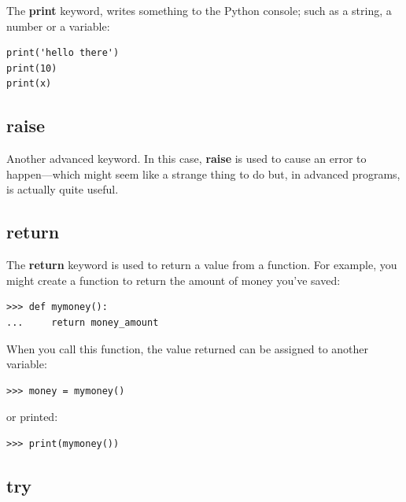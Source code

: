 The \textbf{print} keyword, writes something to the Python console; such as a string, a number or a variable:

\begin{listing}
\begin{verbatim}
print('hello there')
print(10)
print(x)
\end{verbatim}
\end{listing}

\subsection*{raise}

Another advanced keyword.  In this case, \textbf{raise} is used to cause an error to happen---which might seem like a strange thing to do but, in advanced programs, is actually quite useful.

\subsection*{return}

The \textbf{return} keyword is used to return a value from a function.  For example, you might create a function to return the amount of money you've saved:

\begin{listingignore}
\begin{verbatim}
>>> def mymoney():
...     return money_amount
\end{verbatim}
\end{listingignore}

\noindent
When you call this function, the value returned can be assigned to another variable:

\begin{listingignore}
\begin{verbatim}
>>> money = mymoney()
\end{verbatim}
\end{listingignore}

\noindent
or printed:

\begin{listingignore}
\begin{verbatim}
>>> print(mymoney())
\end{verbatim}
\end{listingignore}

\subsection*{try}

